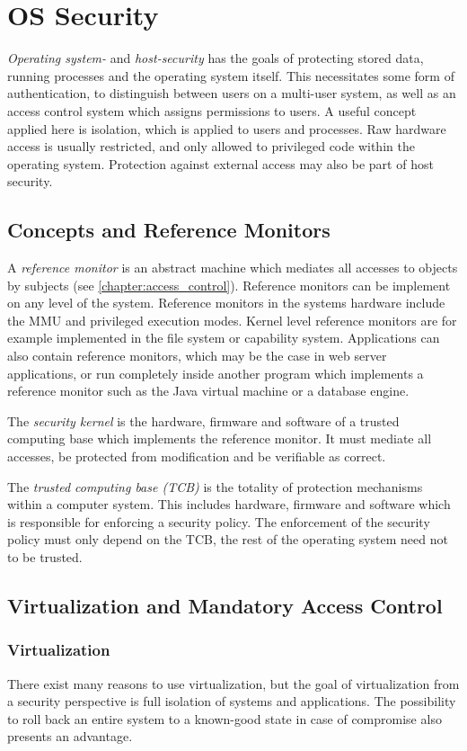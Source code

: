\chapter{OS Security}
\textit{Operating system-} and \emph{host-security} has the goals of protecting
stored data, running processes and the operating system itself. This
necessitates some form of authentication, to distinguish between users on a
multi-user system, as well as an access control system which assigns permissions
to users. A useful concept applied here is isolation, which is applied to users
and processes. Raw hardware access is usually restricted, and only allowed to
privileged code within the operating system. Protection against external access
may also be part of host security.

\section{Concepts and Reference Monitors}
A \emph{reference monitor} is an abstract machine which mediates all accesses to
objects by subjects (see \cref{chapter:access_control}). Reference monitors can
be implement on any level of the system. Reference monitors in the systems
hardware include the MMU and privileged execution modes. Kernel level reference
monitors are for example implemented in the file system or capability system.
Applications can also contain reference monitors, which may be the case in web
server applications, or run completely inside another program which implements a
reference monitor such as the Java virtual machine or a database engine.

The \emph{security kernel} is the hardware, firmware and software of a trusted
computing base which implements the reference monitor. It must mediate all
accesses, be protected from modification and be verifiable as correct.

The \emph{trusted computing base (TCB)} is the totality of protection mechanisms
within a computer system. This includes hardware, firmware and software which is
responsible for enforcing a security policy. The enforcement of the security
policy must only depend on the TCB, the rest of the operating system need not to
be trusted.

\section{Virtualization and Mandatory Access Control}
\subsection{Virtualization}
There exist many reasons to use virtualization, but the goal of virtualization
from a security perspective is full isolation of systems and applications. The
possibility to roll back an entire system to a known-good state in case of
compromise also presents an advantage.

